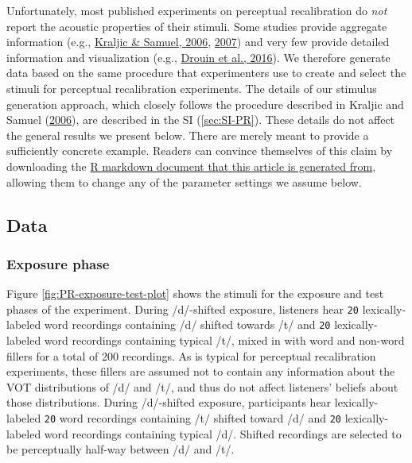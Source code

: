 \documentclass[
  11pt,
  man,floatsintext]{apa6}
\begin{document}
Unfortunately, most published experiments on perceptual recalibration do \emph{not} report the acoustic properties of their stimuli. Some studies provide aggregate information (e.g., \protect\hyperlink{ref-kraljic-samuel2006}{Kraljic \& Samuel, 2006}, \protect\hyperlink{ref-kraljic-samuel2007}{2007}) and very few provide detailed information and visualization (e.g., \protect\hyperlink{ref-drouin2016}{Drouin et al., 2016}).
We therefore generate data based on the same procedure that experimenters use to create and select the stimuli for perceptual recalibration experiments. The details of our stimulus generation approach, which closely follows the procedure described in Kraljic and Samuel (\protect\hyperlink{ref-kraljic-samuel2006}{2006}), are described in the SI (\ref{sec:SI-PR}). These details do not affect the general results we present below. There are merely meant to provide a sufficiently concrete example. Readers can convince themselves of this claim by downloading the \href{https://osf.io/DO-NOT-FORGET-TO-ADD-THE-OSF-URL-HERE-XXX}{R markdown document that this article is generated from}, allowing them to change any of the parameter settings we assume below.

\hypertarget{data}{%
\subsection{Data}\label{data}}

\hypertarget{exposure-phase}{%
\subsubsection{Exposure phase}\label{exposure-phase}}

Figure \ref{fig:PR-exposure-test-plot} shows the stimuli for the exposure and test phases of the experiment. During /d/-shifted exposure, listeners hear \texttt{20} lexically-labeled word recordings containing /d/ shifted towards /t/ and \texttt{20} lexically-labeled word recordings containing typical /t/, mixed in with word and non-word fillers for a total of 200 recordings. As is typical for perceptual recalibration experiments, these fillers are assumed not to contain any information about the VOT distributions of /d/ and /t/, and thus do not affect listeners' beliefs about those distributions. During /d/-shifted exposure, participants hear lexically-labeled \texttt{20} word recordings containing /t/ shifted toward /d/ and \texttt{20} lexically-labeled word recordings containing typical /d/. Shifted recordings are selected to be perceptually half-way between /d/ and /t/.
\end{document}
